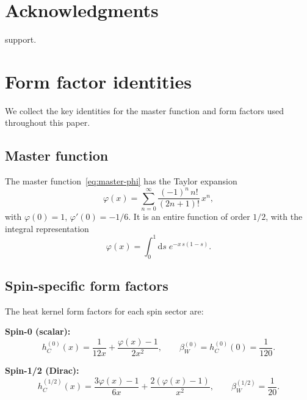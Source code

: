 \documentclass[12pt,a4paper]{article}
\newcommand{\dd}{\mathrm{d}}
\theoremstyle{plain}
\theoremstyle{definition}
\begin{document}
\section*{Acknowledgments}

support.

\appendix
\section{Form factor identities}
\label{app:form-factor-identities}

We collect the key identities for the master function and form factors
used throughout this paper.

\subsection{Master function}

The master function~\eqref{eq:master-phi} has the Taylor expansion
\begin{equation}\label{eq:phi-taylor}
  \varphi(x) = \sum_{n=0}^{\infty} \frac{(-1)^n\, n!}{(2n+1)!}\,x^n,
\end{equation}
with $\varphi(0) = 1$, $\varphi'(0) = -1/6$.  It is an entire function of
order $1/2$, with the integral representation
\begin{equation}\label{eq:phi-integral}
  \varphi(x) = \int_0^1 \dd s\; e^{-x\,s(1-s)}.
\end{equation}

\subsection{Spin-specific form factors}

The heat kernel form factors for each spin sector are:

\noindent\textbf{Spin-0 (scalar):}
\begin{equation}\label{eq:hC-scalar}
  h_C^{(0)}(x) = \frac{1}{12x} + \frac{\varphi(x) - 1}{2x^2},
  \qquad
  \beta_W^{(0)} = h_C^{(0)}(0) = \frac{1}{120}.
\end{equation}

\noindent\textbf{Spin-1/2 (Dirac):}
\begin{equation}\label{eq:hC-dirac}
  h_C^{(1/2)}(x) = \frac{3\varphi(x) - 1}{6x}
  + \frac{2(\varphi(x) - 1)}{x^2},
  \qquad
  \beta_W^{(1/2)} = \frac{1}{20}.
\end{equation}
\end{document}
